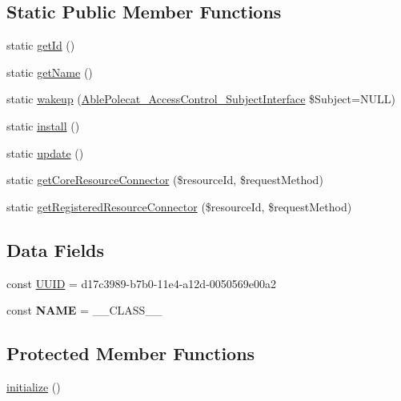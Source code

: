 \subsection*{Static Public Member Functions}
\begin{DoxyCompactItemize}
\item 
static \hyperlink{class_able_polecat___registry___connector_acfaa3a96d0cb5a4c0d4d710dcba41e9e}{get\+Id} ()
\item 
static \hyperlink{class_able_polecat___registry___connector_a4ef9bd37ba3ce8a13c1e8bcf4f72a630}{get\+Name} ()
\item 
static \hyperlink{class_able_polecat___registry___connector_a3f2135f6ad45f51d075657f6d20db2cd}{wakeup} (\hyperlink{interface_able_polecat___access_control___subject_interface}{Able\+Polecat\+\_\+\+Access\+Control\+\_\+\+Subject\+Interface} \$Subject=N\+U\+L\+L)
\item 
static \hyperlink{class_able_polecat___registry___connector_a7ee9452dbd39de4bfbe7a6dd9ed7bb65}{install} ()
\item 
static \hyperlink{class_able_polecat___registry___connector_a00ce4d238d0651db584337f8e0b38c68}{update} ()
\item 
static \hyperlink{class_able_polecat___registry___connector_acc115629812d7e8a4f6aaea17adc0697}{get\+Core\+Resource\+Connector} (\$resource\+Id, \$request\+Method)
\item 
static \hyperlink{class_able_polecat___registry___connector_ac32fe543f752a87d424ab7c5c5f7e69f}{get\+Registered\+Resource\+Connector} (\$resource\+Id, \$request\+Method)
\end{DoxyCompactItemize}
\subsection*{Data Fields}
\begin{DoxyCompactItemize}
\item 
const \hyperlink{class_able_polecat___registry___connector_a74b892c8c0b86bf9d04c5819898c51e7}{U\+U\+I\+D} = \textquotesingle{}d17c3989-\/b7b0-\/11e4-\/a12d-\/0050569e00a2\textquotesingle{}
\item 
\hypertarget{class_able_polecat___registry___connector_a244352f035b82b20b0efa506167fd862}{}const {\bfseries N\+A\+M\+E} = \+\_\+\+\_\+\+C\+L\+A\+S\+S\+\_\+\+\_\+\label{class_able_polecat___registry___connector_a244352f035b82b20b0efa506167fd862}

\end{DoxyCompactItemize}
\subsection*{Protected Member Functions}
\begin{DoxyCompactItemize}
\item 
\hyperlink{class_able_polecat___registry___connector_a91098fa7d1917ce4833f284bbef12627}{initialize} ()
\end{DoxyCompactItemize}
